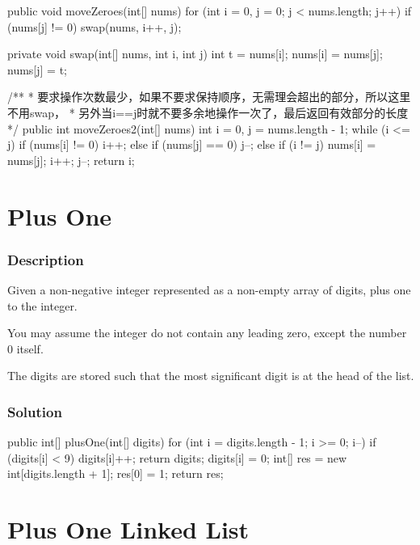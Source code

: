 \begin{Code}
public void moveZeroes(int[] nums) {
    for (int i = 0, j = 0; j < nums.length; j++) {
        if (nums[j] != 0) {
            swap(nums, i++, j);
        }
    }
}

private void swap(int[] nums, int i, int j) {
    int t = nums[i];
    nums[i] = nums[j];
    nums[j] = t;
}

/**
 * 要求操作次数最少，如果不要求保持顺序，无需理会超出的部分，所以这里不用swap，
 * 另外当i==j时就不要多余地操作一次了，最后返回有效部分的长度
 */
public int moveZeroes2(int[] nums) {
    int i = 0, j = nums.length - 1;
    while (i <= j) {
        if (nums[i] != 0) {
            i++;
        } else if (nums[j] == 0) {
            j--;
        } else {
            if (i != j) {
                nums[i] = nums[j];
            }
            i++;
            j--;
        }
    }
    return i;
}
\end{Code}

\newpage

\section{Plus One} %

\subsubsection{Description}
Given a non-negative integer represented as a non-empty array of digits, plus one to the integer.

You may assume the integer do not contain any leading zero, except the number 0 itself.

The digits are stored such that the most significant digit is at the head of the list.

\subsubsection{Solution}

\begin{Code}
public int[] plusOne(int[] digits) {
    for (int i = digits.length - 1; i >= 0; i--) {
        if (digits[i] < 9) {
            digits[i]++;
            return digits;
        }
        digits[i] = 0;
    }
    int[] res = new int[digits.length + 1];
    res[0] = 1;
    return res;
}
\end{Code}

\newpage

\section{Plus One Linked List} %


